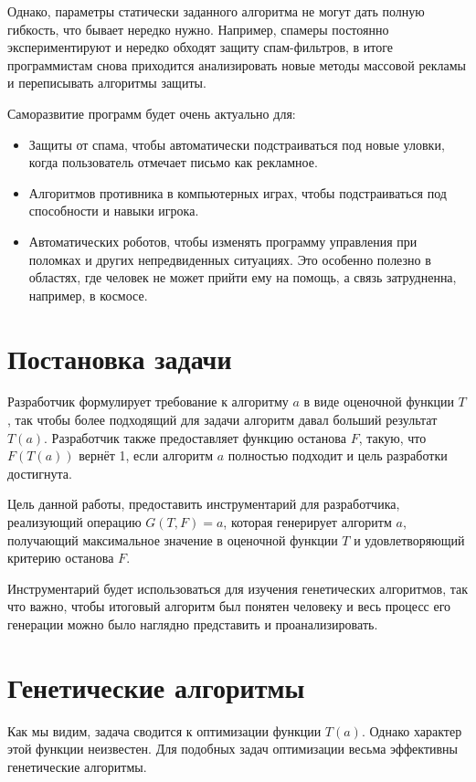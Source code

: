 \documentclass[utf8,a5paper,portrait,12pt]{eskdtext}
\begin{document}
Однако, параметры статически заданного алгоритма не могут дать полную гибкость,
что бывает нередко нужно. Например, спамеры постоянно экспериментируют и нередко
обходят защиту спам-фильтров, в итоге программистам снова приходится
анализировать новые методы массовой рекламы и переписывать алгоритмы защиты.

Саморазвитие программ будет очень актуально для:
\begin{itemize}
  \item Защиты от спама, чтобы автоматически подстраиваться под новые уловки,
        когда пользователь отмечает письмо как рекламное.
  \item Алгоритмов противника в компьютерных играх, чтобы подстраиваться под
        способности и навыки игрока.
  \item Автоматических роботов, чтобы изменять программу управления при
        поломках и других непредвиденных ситуациях.\cite{damage} Это особенно
        полезно в областях, где человек не может прийти ему на помощь, а связь
        затрудненна, например, в космосе.
\end{itemize}

\newpage
\section{Постановка задачи}
Разработчик формулирует требование к алгоритму $a$ в виде оценочной
функции $T$, так чтобы более подходящий для задачи алгоритм давал больший
результат $T(a)$. Разработчик также предоставляет функцию останова $F$, такую,
что $F(T(a))$ вернёт 1, если алгоритм $a$ полностью подходит и цель разработки
достигнута.

Цель данной работы, предоставить инструментарий для разработчика, реализующий
операцию $G(T, F) = a$, которая генерирует алгоритм $a$, получающий максимальное
значение в оценочной функции $T$ и удовлетворяющий критерию останова $F$.

Инструментарий будет использоваться для изучения генетических алгоритмов, так
что важно, чтобы итоговый алгоритм был понятен человеку и весь процесс его
генерации можно было наглядно представить и проанализировать.

\newpage
\section{Генетические алгоритмы}

Как мы видим, задача сводится к оптимизации функции $T(a)$. Однако характер этой
функции неизвестен. Для подобных задач оптимизации весьма эффективны
генетические алгоритмы.\cite{reinforcement}
\end{document}
